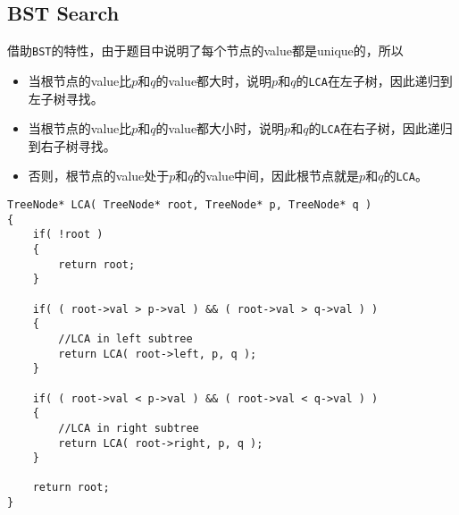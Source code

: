 \subsection{BST Search}
\begin{CJK*}{UTF8}{gbsn}
借助\texttt{BST}的特性，由于题目中说明了每个节点的value都是unique的，所以
\begin{itemize}
\item 当根节点的value比$p$和$q$的value都大时，说明$p$和$q$的\texttt{LCA}在左子树，因此递归到左子树寻找。
\item 当根节点的value比$p$和$q$的value都大小时，说明$p$和$q$的\texttt{LCA}在右子树，因此递归到右子树寻找。
\item 否则，根节点的value处于$p$和$q$的value中间，因此根节点就是$p$和$q$的\texttt{LCA}。
\end{itemize}
\end{CJK*}
\setcounter{lstlisting}{0}
\begin{lstlisting}[style=customc, caption={BST Properties}]
TreeNode* LCA( TreeNode* root, TreeNode* p, TreeNode* q )
{
    if( !root )
    {
        return root;
    }

    if( ( root->val > p->val ) && ( root->val > q->val ) )
    {
        //LCA in left subtree
        return LCA( root->left, p, q );
    }

    if( ( root->val < p->val ) && ( root->val < q->val ) )
    {
        //LCA in right subtree
        return LCA( root->right, p, q );
    }

    return root;
}

\end{lstlisting}